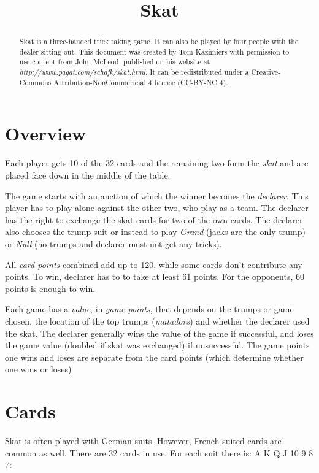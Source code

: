 \documentclass[letter]{article}
\begin{document}
  \title{Skat}
  \date{}
  \maketitle

  \begin{abstract}
    Skat is a three-handed trick taking game. It can also be played by four
    people with the dealer sitting out. This document was created by Tom
    Kazimiers with permission to use content from John McLeod, published on his
    website at \emph{http://www.pagat.com/schafk/skat.html}. It can be
    redistributed under a Creative-Commons Attribution-NonCommericial 4
    license (CC-BY-NC 4).
  \end{abstract}

  \section*{Overview}

  Each player gets 10 of the 32 cards and the remaining two form the
  \emph{skat} and are placed face down in the middle of the table.

  The game starts with an auction of which the winner becomes the
  \emph{declarer}. This player has to play alone against the other two, who play
  as a team. The declarer has the right to exchange the skat cards for two of
  the own cards. The declarer also chooses the trump suit or instead to play
  \emph{Grand} (jacks are the only trump) or \emph{Null} (no trumps and declarer
  must not get any tricks).

  All \emph{card points} combined add up to 120, while some cards don't
  contribute any points. To win, declarer has to to take at least 61 points. For
  the opponents, 60 points is enough to win.

  Each game has a \emph{value}, in \emph{game points}, that depends on the
  trumps or game chosen, the location of the top trumps (\emph{matadors}) and
  whether the declarer used the skat. The declarer generally wins the value of
  the game if successful, and loses the game value (doubled if skat was
  exchanged) if unsuccessful. The game points one wins and loses are separate
  from the card points (which determine whether one wins or loses)


  \section*{Cards}
  
  Skat is often played with German suits. However, French suited cards are
  common as well. There are 32 cards in use. For each suit there is: A K Q J 10
  9 8 7:
\end{document}
